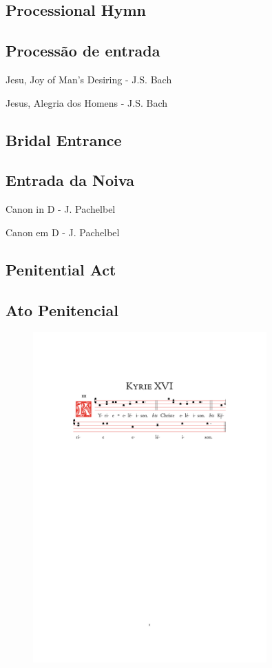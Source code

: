 \documentclass[10pt,a4]{article}
\newcommand \subsect[2] {\subsection*{#1} \switchcolumn \subsection*{#2} \switchcolumn*}
\begin{document}
\begin{paracol}{2}
	\subsect{Processional Hymn}{Process\~ao de entrada}

	\hspace*{2em} Jesu, Joy of Man's Desiring - J.S. Bach

	\switchcolumn

	\hspace*{2em} Jesus, Alegria dos Homens - J.S. Bach

	\switchcolumn*

	\subsect{Bridal Entrance}{Entrada da Noiva}

	\hspace*{2em} Canon in D - J. Pachelbel

	\switchcolumn

	\hspace*{2em} Canon em D - J. Pachelbel

	\switchcolumn*

	\subsect{Penitential Act}{Ato Penitencial}
\end{paracol}

\begin{figure}[h]
	\centering
	\includegraphics[trim = 35mm 200mm 35.5mm 35mm, clip, width = 0.8\textwidth]{scores/Kyrie-XVI.pdf}
\end{figure}
\end{document}
